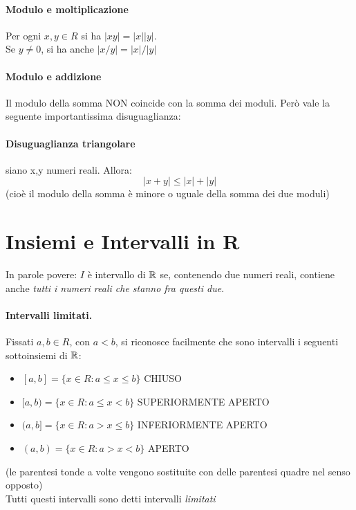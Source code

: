 \documentclass[12pt, a4paper, openany]{book}
\begin{document}
\paragraph{Modulo e moltiplicazione}
Per ogni $x, y \in R$ si ha $|xy| = |x||y|$.\\Se $y\neq0$, si ha anche $|x/y|=|x|/|y|$
\paragraph{Modulo e addizione}
Il modulo della somma NON coincide con la somma dei moduli. Però vale la seguente importantissima disuguaglianza:
\paragraph{Disuguaglianza triangolare} siano x,y numeri reali. Allora:
\begin{equation}
	|x+y| \leq |x| + |y|
\end{equation}
(cioè il modulo della somma è minore o uguale della somma dei due moduli)

\section{Insiemi e Intervalli in R}

In parole povere: $I$ è intervallo di $\mathbb{R}$ se, contenendo due numeri reali, contiene anche \emph{tutti i numeri reali che stanno fra questi due}.

\paragraph{Intervalli limitati.}
Fissati $a, b \in R$, con $a<b$, si riconosce facilmente che sono intervalli i seguenti sottoinsiemi di $\mathbb{R}$:
\begin{itemize}
	\item[] $[a,b] = \{x \in R : a \leq x \leq b\}$ CHIUSO
	\item[] $[a,b) = \{x \in R : a \leq x < b\}$ SUPERIORMENTE APERTO
	\item[] $(a,b] = \{x \in R : a > x \leq b\}$ INFERIORMENTE APERTO
	\item[] $(a,b) = \{x \in R : a > x < b\}$ APERTO
\end{itemize}
{\tiny(le parentesi tonde a volte vengono sostituite con delle parentesi quadre nel senso opposto)}
\\Tutti questi intervalli sono detti intervalli \emph{limitati}
\end{document}
